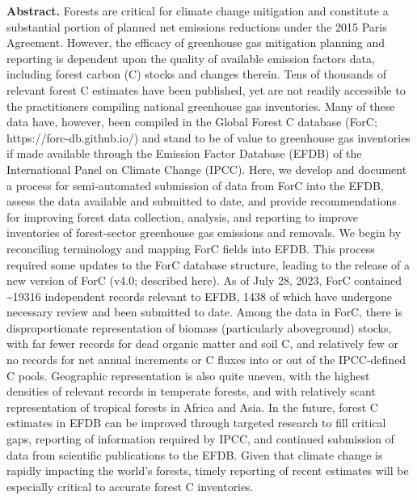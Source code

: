 \documentclass[, manuscript]{copernicus}
\begin{document}
\textbf{Abstract.} Forests are critical for climate change mitigation
and constitute a substantial portion of planned net emissions reductions
under the 2015 Paris Agreement. However, the efficacy of greenhouse gas
mitigation planning and reporting is dependent upon the quality of
available emission factors data, including forest carbon (C) stocks and
changes therein. Tens of thousands of relevant forest C estimates have
been published, yet are not readily accessible to the practitioners
compiling national greenhouse gas inventories. Many of these data have,
however, been compiled in the Global Forest C database (ForC;
https://forc-db.github.io/) and stand to be of value to greenhouse gas
inventories if made available through the Emission Factor Database
(EFDB) of the International Panel on Climate Change (IPCC). Here, we
develop and document a process for semi-automated submission of data
from ForC into the EFDB, assess the data available and submitted to
date, and provide recommendations for improving forest data collection,
analysis, and reporting to improve inventories of forest-sector
greenhouse gas emissions and removals. We begin by reconciling
terminology and mapping ForC fields into EFDB. This process required
some updates to the ForC database structure, leading to the release of a
new version of ForC (v4.0; described here). As of July 28, 2023, ForC
contained \textasciitilde19316 independent records relevant to EFDB,
1438 of which have undergone necessary review and been submitted to
date. Among the data in ForC, there is disproportionate representation
of biomass (particularly aboveground) stocks, with far fewer records for
dead organic matter and soil C, and relatively few or no records for net
annual increments or C fluxes into or out of the IPCC-defined C pools.
Geographic representation is also quite uneven, with the highest
densities of relevant records in temperate forests, and with relatively
scant representation of tropical forests in Africa and Asia. In the
future, forest C estimates in EFDB can be improved through targeted
research to fill critical gaps, reporting of information required by
IPCC, and continued submission of data from scientific publications to
the EFDB. Given that climate change is rapidly impacting the world's
forests, timely reporting of recent estimates will be especially
critical to accurate forest C inventories.

\introduction[Introduction]
\end{document}
